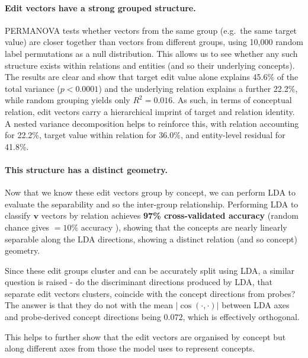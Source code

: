 \documentclass[11pt,a4paper]{article}
\newcommand{\vv}{\mathbf{v}}
\newcommand{\abs}[1]{\lvert #1 \rvert}
\newcommand{\cosim}{\abs{\cos(\cdot,\cdot)}}
\begin{document}
\paragraph{Edit vectors have a strong grouped structure.}
PERMANOVA tests whether vectors from the same group (e.g.\ the same target value) are closer together than vectors from different groups, using 10{,}000 random label permutations as a null distribution. This allows us to see whether any such structure exists within relations and entities (and so their underlying concepts).
The results are clear and show that target edit value alone explains 45.6\% of the total variance ($p < 0.0001$) and the underlying relation explains a further 22.2\%, while random grouping yields only $R^2 = 0.016$. As such, in terms of conceptual relation, edit vectors carry a hierarchical imprint of target and relation identity. A nested variance decomposition helps to reinforce this, with relation accounting for 22.2\%, target value within relation for 36.0\%, and entity-level residual for 41.8\%.

\paragraph{This structure has a distinct geometry.}
Now that we know these edit vectors group by concept, we can perform LDA to evaluate the separability and so the inter-group relationship.
Performing LDA to classify $\vv$ vectors by relation achieves \textbf{97\% cross-validated accuracy} (random chance gives $= 10\%$ accuracy ), showing that the concepts are nearly linearly separable along the LDA directions, showing a distinct relation (and so concept) geometry.

Since these edit groups cluster and can be accurately split using LDA, a similar question is raised - do the discriminant directions produced by LDA, that separate edit vectors clusters, coincide with the concept directions from probes? The answer is that they do not with the mean $\cosim$ between LDA axes and probe-derived concept directions being $0.072$, which is effectively orthogonal. 

This helps to further show that the edit vectors are organised by concept but along different axes from those the model uses to represent concepts. 

\end{document}
